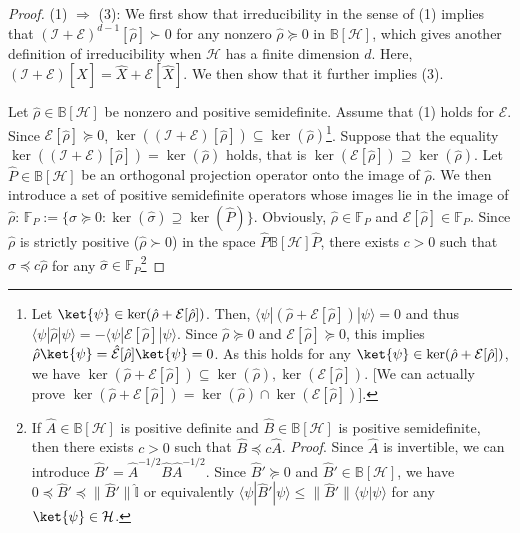 \documentclass[preprint,pteplogo]{ptephy_v2}%
\numberwithin{equation}{section}
\theoremstyle{definition}
\newcommand{\mc}[1]{\mathcal{#1}}
\newcommand{\mbb}[1]{\mathbb{#1}}
\begin{document}
\begin{proof}
(1) $\Rightarrow$ (3): 
We first show that irreducibility in the sense of (1) implies that $(\mc{I}+\mc{E})^{d-1}[\hat{\rho}] \succ 0$ for any nonzero $\hat{\rho} \succeq 0$ in $\mbb{B}[\mc{H}]$, which gives another definition of irreducibility when $\mc{H}$ has a finite dimension $d$.
Here, $(\mc{I}+\mc{E})[\hat{X}] = \hat{X} + \mc{E}[\hat{X}]$. 
We then show that it further implies (3).

Let $\hat{\rho} \in \mbb{B}[\mc{H}]$ be nonzero and positive semidefinite. 
Assume that (1) holds for $\mc{E}$. 
Since $\mc{E}[\hat{\rho}] \succeq 0$, $\ker((\mc{I}+\mc{E})[\hat{\rho}]) \subseteq \ker(\hat{\rho})$\footnote{
Let $\ket{\psi} \in \ker(\hat{\rho}+\mc{E}[\hat{\rho}])$.
Then, $\langle \psi | (\hat{\rho}+\mc{E}[\hat{\rho}]) | \psi \rangle = 0$ and thus $\langle \psi | \hat{\rho} | \psi \rangle = -\langle \psi | \mc{E}[\hat{\rho}] | \psi \rangle$. 
Since $\hat{\rho} \succeq 0$ and $\mc{E}[\hat{\rho}] \succeq 0$, this implies $\hat{\rho} \ket{\psi} = \hat{\mc{E}}[\hat{\rho}] \ket{\psi} = 0$. 
As this holds for any $\ket{\psi} \in \ker(\hat{\rho}+\mc{E}[\hat{\rho}])$, we have $\ker(\hat{\rho}+\mc{E}[\hat{\rho}]) \subseteq \ker(\hat{\rho}), \ker(\mc{E}[\hat{\rho}])$. 
[We can actually prove $\ker(\hat{\rho} + \mc{E}[\hat{\rho}]) = \ker(\hat{\rho}) \cap \ker(\mc{E}[\hat{\rho}])$].}. 
Suppose that the equality $\ker((\mc{I}+\mc{E})[\hat{\rho}]) = \ker(\hat{\rho})$ holds, that is $\ker(\mc{E}[\hat{\rho}]) \supseteq \ker(\hat{\rho})$.
Let $\hat{P} \in \mbb{B}[\mc{H}]$ be an orthogonal projection operator onto the image of $\hat{\rho}$.
We then introduce a set of positive semidefinite operators whose images lie in the image of $\hat{\rho}$: $\mbb{F}_P := \{ \hat{\sigma} \succeq 0 : \ker(\hat{\sigma}) \supseteq \ker(\hat{P}) \}$. 
Obviously, $\hat{\rho} \in \mbb{F}_P$ and $\mc{E}[\hat{\rho}] \in \mbb{F}_P$.
Since $\hat{\rho}$ is strictly positive ($\hat{\rho} \succ 0$) in the space $\hat{P} \mbb{B}[\mc{H}]\hat{P}$, there exists $c>0$ such that $\hat{\sigma} \preceq c \hat{\rho}$ for any $\hat{\sigma} \in \mbb{F}_P$\footnote{
If $\hat{A} \in \mbb{B}[\mc{H}]$ is positive definite and $\hat{B} \in \mbb{B}[\mc{H}]$ is positive semidefinite, then there exists $c>0$ such that $\hat{B} \preceq c \hat{A}$.
\textit{Proof}. Since $\hat{A}$ is invertible, we can introduce $\hat{B}' = \hat{A}^{-1/2} \hat{B} \hat{A}^{-1/2}$. 
Since $\hat{B}' \succeq 0$ and $\hat{B}' \in \mbb{B}[\mc{H}]$, we have $0 \preceq \hat{B}' \preceq \| \hat{B}' \| \hat{\mbb{I}}$ or equivalently $\langle \psi | \hat{B}' | \psi \rangle \leq \| \hat{B}' \| \langle \psi | \psi \rangle$ for any $\ket{\psi} \in \mc{H}$. 
}
\end{proof}
\end{document}
